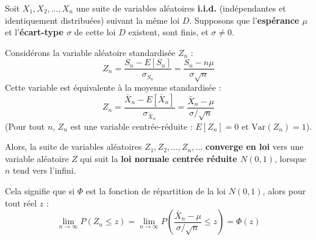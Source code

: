 \begin{theorembox}
Soit $X_1, X_2, \dots, X_n$ une suite de variables aléatoires \textbf{i.i.d.} (indépendantes et identiquement distribuées) suivant la même loi $D$.
Supposons que l'\textbf{espérance $\mu$} et l'\textbf{écart-type $\sigma$} de cette loi $D$ existent, sont finis, et $\sigma \neq 0$.

Considérons la variable aléatoire standardisée $Z_n$ :
$$ Z_n = \frac{S_n - E[S_n]}{\sigma_{S_n}} = \frac{S_n - n\mu}{\sigma\sqrt{n}} $$
Cette variable est équivalente à la moyenne standardisée :
$$ Z_n = \frac{\bar{X}_n - E[\bar{X}_n]}{\sigma_{\bar{X}_n}} = \frac{\bar{X}_n - \mu}{\sigma / \sqrt{n}} $$
(Pour tout $n$, $Z_n$ est une variable centrée-réduite : $E[Z_n] = 0$ et $\text{Var}(Z_n) = 1$).

Alors, la suite de variables aléatoires $Z_1, Z_2, \dots, Z_n, \dots$ \textbf{converge en loi} vers une variable aléatoire $Z$ qui suit la \textbf{loi normale centrée réduite $N(0, 1)$}, lorsque $n$ tend vers l'infini.

Cela signifie que si $\Phi$ est la fonction de répartition de la loi $N(0, 1)$, alors pour tout réel $z$ :
$$ \lim_{n \to \infty} P(Z_n \le z) = \lim_{n \to \infty} P\left( \frac{\bar{X}_n - \mu}{\sigma/\sqrt{n}} \le z \right) = \Phi(z) $$
\end{theorembox}